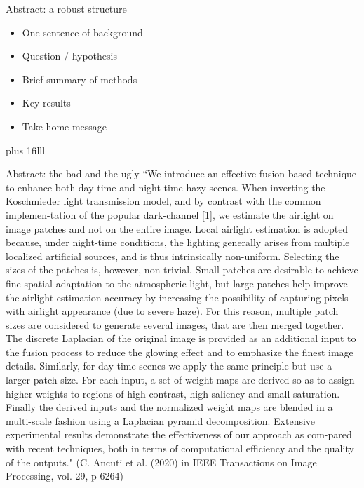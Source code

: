 \documentclass[aspectratio=169]{beamer}
\newcommand{\btVFill}{\vskip0pt plus 1filll}
\begin{document}
\begin{frame}{Abstract: a robust structure}
  \begin{itemize}
    \item One sentence of background
    \item Question / hypothesis
    \item Brief summary of methods
    \item Key results
    \item Take-home message
  \end{itemize}
  \btVFill
\end{frame}

\begin{frame}{Abstract: the bad and the ugly}
  \footnotesize{``We introduce an effective fusion-based technique to enhance both day-time and night-time hazy scenes. When inverting the Koschmieder light transmission model, and by contrast with the common implemen-tation of the popular dark-channel [1], we estimate the airlight on image patches and not on the entire image. Local airlight estimation is adopted because, under night-time conditions, the lighting generally arises from multiple localized artificial sources, and is thus intrinsically non-uniform. Selecting the sizes of the patches is, however, non-trivial. Small patches are desirable to achieve fine spatial adaptation to the atmospheric light, but large patches help improve the airlight estimation accuracy by increasing the possibility of capturing pixels with airlight appearance (due to severe haze). For this reason, multiple patch sizes are considered to generate several images, that are then merged together. The discrete Laplacian of the original image is provided as an additional input to the fusion process to reduce the glowing effect and to emphasize the finest image details. Similarly, for day-time scenes we apply the same principle but use a larger patch size. For each input, a set of weight maps are derived so as to assign higher weights to regions of high contrast, high saliency and small saturation. Finally the derived inputs and the normalized weight maps are blended in a multi-scale fashion using a Laplacian pyramid decomposition. Extensive experimental results demonstrate the effectiveness of our approach as com-pared with recent techniques, both in terms of computational efficiency and the quality of the outputs." (C. Ancuti et al. (2020) in IEEE Transactions on Image Processing, vol. 29, p 6264)}
\end{frame}
\end{document}
